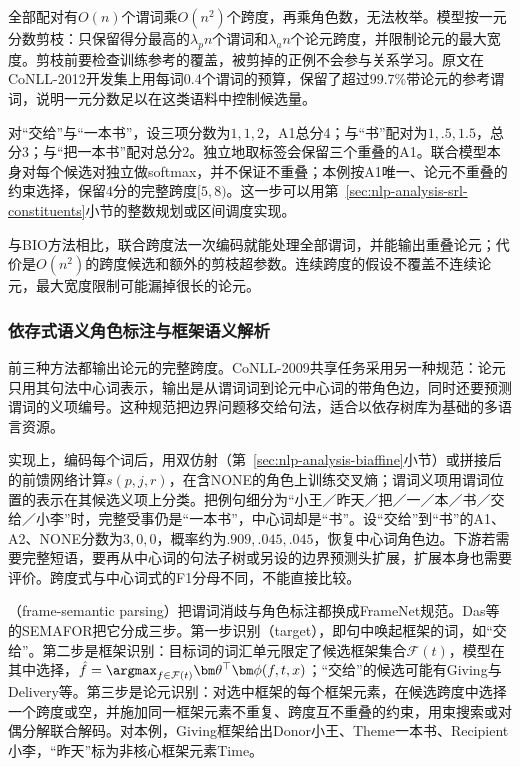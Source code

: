 全部配对有$O(n)$个谓词乘$O(n^2)$个跨度，再乘角色数，无法枚举。模型按一元分数剪枝：只保留得分最高的$\lambda_p n$个谓词和$\lambda_a n$个论元跨度，并限制论元的最大宽度。剪枝前要检查训练参考的覆盖，被剪掉的正例不会参与关系学习。原文在CoNLL-2012开发集上用每词0.4个谓词的预算，保留了超过99.7\%带论元的参考谓词，说明一元分数足以在这类语料中控制候选量。

对“交给”与“一本书”，设三项分数为$1,1,2$，A1总分4；与“书”配对为$1,.5,1.5$，总分3；与“把一本书”配对总分2。独立地取标签会保留三个重叠的A1。联合模型本身对每个候选对独立做softmax，并不保证不重叠；本例按A1唯一、论元不重叠的约束选择，保留4分的完整跨度$[5,8)$。这一步可以用第~\ref{sec:nlp-analysis-srl-constituents}小节的整数规划或区间调度实现。

与BIO方法相比，联合跨度法一次编码就能处理全部谓词，并能输出重叠论元；代价是$O(n^2)$的跨度候选和额外的剪枝超参数。连续跨度的假设不覆盖不连续论元，最大宽度限制可能漏掉很长的论元。

\subsubsection{依存式语义角色标注与框架语义解析}
\label{sec:nlp-analysis-srl-dependency}

前三种方法都输出论元的完整跨度。CoNLL-2009共享任务采用另一种规范：论元只用其句法中心词表示，输出是从谓词词到论元中心词的带角色边，同时还要预测谓词的义项编号。这种规范把边界问题移交给句法，适合以依存树库为基础的多语言资源。

实现上，编码每个词后，用双仿射（第~\ref{sec:nlp-analysis-biaffine}小节）或拼接后的前馈网络计算$s(p,j,r)$，在含NONE的角色上训练交叉熵；谓词义项用谓词位置的表示在其候选义项上分类。把例句细分为“小王／昨天／把／一／本／书／交给／小李”时，完整受事仍是“一本书”，中心词却是“书”。设“交给”到“书”的A1、A2、NONE分数为$3,0,0$，概率约为$.909,.045,.045$，恢复中心词角色边。下游若需要完整短语，要再从中心词的句法子树或另设的边界预测头扩展，扩展本身也需要评价。跨度式与中心词式的F1分母不同，不能直接比较。

（frame-semantic parsing）把谓词消歧与角色标注都换成FrameNet规范。Das等的SEMAFOR把它分成三步。第一步识别（target），即句中唤起框架的词，如“交给”。第二步是框架识别：目标词的词汇单元限定了候选框架集合$\mathcal F(t)$，模型在其中选择，$\hat f=\argmax_{f\in\mathcal F(t)}\bm\theta^{\top}\bm\phi(f,t,x)$；“交给”的候选可能有Giving与Delivery等。第三步是论元识别：对选中框架的每个框架元素，在候选跨度中选择一个跨度或空，并施加同一框架元素不重复、跨度互不重叠的约束，用束搜索或对偶分解联合解码。对本例，Giving框架给出Donor小王、Theme一本书、Recipient小李，“昨天”标为非核心框架元素Time。

